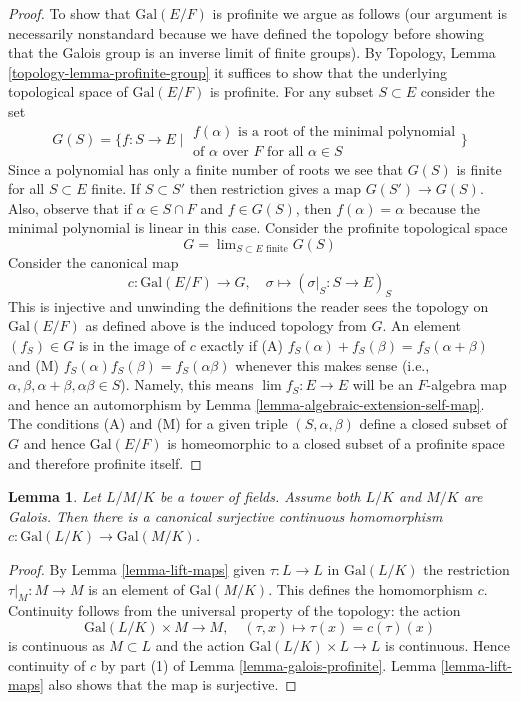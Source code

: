 \documentclass{stacks-project}
\theoremstyle{plain}
\newtheorem{lemma}[subsection]{Lemma}
\theoremstyle{definition}
\theoremstyle{remark}
\numberwithin{equation}{subsection}
\def\lim{\mathop{\mathrm{lim}}\nolimits}
\begin{document}
\begin{proof}
\medskip\noindent
To show that $\text{Gal}(E/F)$ is profinite we argue as follows
(our argument is necessarily nonstandard because we have defined
the topology before showing that the Galois group is an inverse
limit of finite groups).
By Topology, Lemma \ref{topology-lemma-profinite-group}
it suffices to show that the underlying
topological space of $\text{Gal}(E/F)$ is profinite.
For any subset $S \subset E$ consider the set
$$
G(S) = \{ f : S \to E \mid
\begin{matrix}
f(\alpha)\text{ is a root of the minimal polynomial}\\
\text{of }\alpha\text{ over }F\text{ for all }\alpha \in S
\end{matrix}
\}
$$
Since a polynomial has only a finite number of roots we see that
$G(S)$ is finite for all $S \subset E$ finite. If $S \subset S'$
then restriction gives a map $G(S') \to G(S)$. Also, observe
that if $\alpha \in S \cap F$ and $f \in G(S)$, then $f(\alpha) = \alpha$
because the minimal polynomial is linear in this case.
Consider the profinite topological space
$$
G = \lim_{S \subset E\text{ finite}} G(S)
$$
Consider the canonical map
$$
c : \text{Gal}(E/F) \longrightarrow G,\quad
\sigma \longmapsto (\sigma|_S : S \to E)_S
$$
This is injective and unwinding the definitions the
reader sees the topology on $\text{Gal}(E/F)$ as defined above
is the induced topology from $G$. An element $(f_S) \in G$ is in
the image of $c$ exactly if
(A) $f_S(\alpha) + f_S(\beta) = f_S(\alpha + \beta)$ and
(M) $f_S(\alpha)f_S(\beta) = f_S(\alpha\beta)$ whenever
this makes sense (i.e.,
$\alpha, \beta, \alpha + \beta, \alpha\beta \in S$).
Namely, this means
$\lim f_S : E \to E$ will be an $F$-algebra map
and hence an automorphism by
Lemma \ref{lemma-algebraic-extension-self-map}.
The conditions (A) and (M) for a given triple
$(S, \alpha, \beta)$ define a closed subset of
$G$ and hence $\text{Gal}(E/F)$ is homeomorphic
to a closed subset of a profinite space and therefore
profinite itself.
\end{proof}

\begin{lemma}
\label{lemma-galois-infinite}
Let $L/M/K$ be a tower of fields. Assume both $L/K$ and
$M/K$ are Galois. Then there is a canonical surjective continuous
homomorphism $c : \text{Gal}(L/K) \to \text{Gal}(M/K)$.
\end{lemma}

\begin{proof}
By Lemma \ref{lemma-lift-maps} given $\tau : L \to L$ in
$\text{Gal}(L/K)$ the restriction $\tau|_M : M \to M$
is an element of $\text{Gal}(M/K)$. This defines the homomorphism $c$.
Continuity follows from the universal property of the topology:
the action
$$
\text{Gal}(L/K) \times M \longrightarrow M,\quad
(\tau, x) \longmapsto \tau(x) = c(\tau)(x)
$$
is continuous as $M \subset L$ and the action
$\text{Gal}(L/K) \times L \to L$ is continuous.
Hence continuity of $c$ by part (1) of
Lemma \ref{lemma-galois-profinite}.
Lemma \ref{lemma-lift-maps} also
shows that the map is surjective.
\end{proof}
\end{document}
